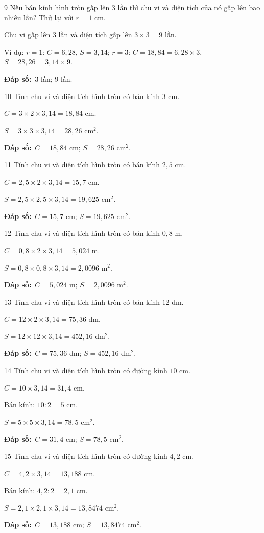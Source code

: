 \documentclass[11pt]{article}
\newif\ifsol \solfalse
\providecommand{\AnsWord}{Đáp số}
\newcommand{\dapso}[1]{\par\textbf{\AnsWord:}\ #1}
\newcommand{\probsol}[1]{%
  \begin{lrbox}{\solmeasure}\begin{minipage}{\dimexpr\linewidth-24pt\relax}#1\end{minipage}\end{lrbox}%
  \ifsol
    \begin{solbox}#1\end{solbox}%
  \else
    \setlength{\solht}{\dimexpr\ht\solmeasure+\dp\solmeasure+0.85cm\relax}%
    \ifdim\solht<1.35cm\setlength{\solht}{1.35cm}\fi
    \begin{tcolorbox}[colback=white,colframe=Line,boxrule=0.8pt,arc=5pt,
      left=8pt,right=8pt,top=4pt,bottom=4pt,height=\solht]{\footnotesize\color{Slate}\itshape\WorkWord}\end{tcolorbox}%
  \fi}
\newcommand{\gap}{\vspace{0.3cm}}
\def\WorkWord{Bài làm:}
\def\AnsWord{Đáp số}
\begin{document}
\gap
\begin{probbox}{9}{\relax}
Nếu bán kính hình tròn gấp lên $3$ lần thì chu vi và diện tích của nó gấp lên bao nhiêu lần? Thử lại với $r=1$ cm.
\end{probbox}
\probsol{
Chu vi gấp lên $3$ lần và diện tích gấp lên $3\times3=9$ lần.\par Ví dụ: $r=1$: $C=6{,}28$, $S=3{,}14$; $r=3$: $C=18{,}84=6{,}28\times3$, $S=28{,}26=3{,}14\times9$.
\dapso{$3$ lần; $9$ lần.}}
\gap
\begin{probbox}{10}{\relax}
Tính chu vi và diện tích hình tròn có bán kính $3$ cm.
\end{probbox}
\probsol{
$C=3\times2\times3{,}14=18{,}84$ cm.\par $S=3\times3\times3{,}14=28{,}26$ cm$^2$.
\dapso{$C=18{,}84$ cm; $S=28{,}26$ cm$^2$.}}
\gap
\begin{probbox}{11}{\relax}
Tính chu vi và diện tích hình tròn có bán kính $2{,}5$ cm.
\end{probbox}
\probsol{
$C=2{,}5\times2\times3{,}14=15{,}7$ cm.\par $S=2{,}5\times2{,}5\times3{,}14=19{,}625$ cm$^2$.
\dapso{$C=15{,}7$ cm; $S=19{,}625$ cm$^2$.}}
\gap
\begin{probbox}{12}{\relax}
Tính chu vi và diện tích hình tròn có bán kính $0{,}8$ m.
\end{probbox}
\probsol{
$C=0{,}8\times2\times3{,}14=5{,}024$ m.\par $S=0{,}8\times0{,}8\times3{,}14=2{,}0096$ m$^2$.
\dapso{$C=5{,}024$ m; $S=2{,}0096$ m$^2$.}}
\gap
\begin{probbox}{13}{\relax}
Tính chu vi và diện tích hình tròn có bán kính $12$ dm.
\end{probbox}
\probsol{
$C=12\times2\times3{,}14=75{,}36$ dm.\par $S=12\times12\times3{,}14=452{,}16$ dm$^2$.
\dapso{$C=75{,}36$ dm; $S=452{,}16$ dm$^2$.}}
\gap
\begin{probbox}{14}{\relax}
Tính chu vi và diện tích hình tròn có đường kính $10$ cm.
\end{probbox}
\probsol{
$C=10\times3{,}14=31{,}4$ cm.\par Bán kính: $10:2=5$ cm.\par $S=5\times5\times3{,}14=78{,}5$ cm$^2$.
\dapso{$C=31{,}4$ cm; $S=78{,}5$ cm$^2$.}}
\gap
\begin{probbox}{15}{\relax}
Tính chu vi và diện tích hình tròn có đường kính $4{,}2$ cm.
\end{probbox}
\probsol{
$C=4{,}2\times3{,}14=13{,}188$ cm.\par Bán kính: $4{,}2:2=2{,}1$ cm.\par $S=2{,}1\times2{,}1\times3{,}14=13{,}8474$ cm$^2$.
\dapso{$C=13{,}188$ cm; $S=13{,}8474$ cm$^2$.}}
\end{document}

